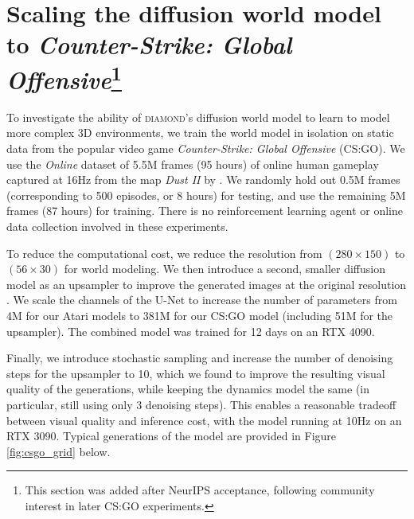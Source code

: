 \section{Scaling the diffusion world model to \textit{Counter-Strike: Global Offensive}\protect\footnote{This section was added after NeurIPS acceptance, following community interest in later CS:GO experiments.}}
\label{sec:csgo}

To investigate the ability of \textsc{diamond}'s diffusion world model to learn to model more complex 3D environments, we train the world model in isolation on static data from the popular video game \textit{Counter-Strike: Global Offensive} (CS:GO). We use the \textit{Online} dataset of 5.5M frames (95 hours) of online human gameplay captured at 16Hz from the map \textit{Dust II} by \citet{pearce2022counter}. We randomly hold out 0.5M frames (corresponding to 500 episodes, or 8 hours) for testing, and use the remaining 5M frames (87 hours) for training. There is no reinforcement learning agent or online data collection involved in these experiments.

To reduce the computational cost, we reduce the resolution from $(280\times150)$ to $(56\times30)$ for world modeling. We then introduce a second, smaller diffusion model as an upsampler to improve the generated images at the original resolution \citep{saharia2022image}. We scale the channels of the U-Net to increase the number of parameters from 4M for our Atari models to 381M for our CS:GO model (including 51M for the upsampler). The combined model was trained for 12 days on an RTX 4090. 

Finally, we introduce stochastic sampling and increase the number of denoising steps for the upsampler to 10, which we found to improve the resulting visual quality of the generations, while keeping the dynamics model the same (in particular, still using only 3 denoising steps). This enables a reasonable tradeoff between visual quality and inference cost, with the model running at 10Hz on an RTX 3090. Typical generations of the model are provided in Figure \ref{fig:csgo_grid} below.

